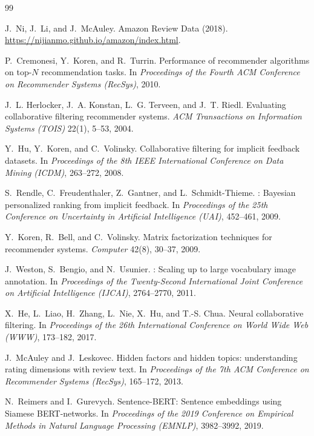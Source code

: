 \documentclass[sigconf,nonacm]{acmart}
\begin{document}
\begin{thebibliography}{99}

J.~Ni, J.~Li, and J.~McAuley.
\newblock Amazon Review Data (2018).
\newblock \url{https://nijianmo.github.io/amazon/index.html}.

P.~Cremonesi, Y.~Koren, and R.~Turrin.
\newblock Performance of recommender algorithms on top-$N$ recommendation tasks.
\newblock In \emph{Proceedings of the Fourth ACM Conference on Recommender Systems (RecSys)}, 2010.

J.~L. Herlocker, J.~A. Konstan, L.~G. Terveen, and J.~T. Riedl.
\newblock Evaluating collaborative filtering recommender systems.
\newblock \emph{ACM Transactions on Information Systems (TOIS)} 22(1), 5--53, 2004.

Y.~Hu, Y.~Koren, and C.~Volinsky.
\newblock Collaborative filtering for implicit feedback datasets.
\newblock In \emph{Proceedings of the 8th IEEE International Conference on Data Mining (ICDM)}, 263--272, 2008.

S.~Rendle, C.~Freudenthaler, Z.~Gantner, and L.~Schmidt-Thieme.
: Bayesian personalized ranking from implicit feedback.
\newblock In \emph{Proceedings of the 25th Conference on Uncertainty in Artificial Intelligence (UAI)}, 452--461, 2009.

Y.~Koren, R.~Bell, and C.~Volinsky.
\newblock Matrix factorization techniques for recommender systems.
\newblock \emph{Computer} 42(8), 30--37, 2009.

J.~Weston, S.~Bengio, and N.~Usunier.
: Scaling up to large vocabulary image annotation.
\newblock In \emph{Proceedings of the Twenty-Second International Joint Conference on Artificial Intelligence (IJCAI)}, 2764--2770, 2011.

X.~He, L.~Liao, H.~Zhang, L.~Nie, X.~Hu, and T.-S. Chua.
\newblock Neural collaborative filtering.
\newblock In \emph{Proceedings of the 26th International Conference on World Wide Web (WWW)}, 173--182, 2017.

J.~McAuley and J.~Leskovec.
\newblock Hidden factors and hidden topics: understanding rating dimensions with review text.
\newblock In \emph{Proceedings of the 7th ACM Conference on Recommender Systems (RecSys)}, 165--172, 2013.

N.~Reimers and I.~Gurevych.
\newblock Sentence-{BERT}: Sentence embeddings using {Siamese} {BERT}-networks.
\newblock In \emph{Proceedings of the 2019 Conference on Empirical Methods in Natural Language Processing (EMNLP)}, 3982--3992, 2019.


\end{thebibliography}
\end{document}
